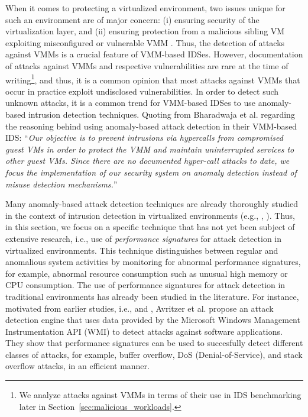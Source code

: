 When it comes to protecting a virtualized environment, two issues unique for such an environment are of major concern: (i) ensuring security of the virtualization layer, and (ii) ensuring protection from a malicious sibling VM exploiting misconfigured or vulnerable VMM \cite{bharadwaja:axen}. Thus, the detection of attacks against VMMs is a crucial feature of VMM-based IDSes. However, documentation of attacks against VMMs and respective vulnerabilities are rare at the time of writing\footnote{We analyze attacks against VMMs in terms of their use in IDS benchmarking later in Section~\ref{sec:malicious_workloads}.}, and thus, it is a common opinion that most attacks against VMMs that occur in practice exploit undisclosed vulnerabilities. In order to detect such unknown attacks, it is a common trend for VMM-based IDSes to use anomaly-based intrusion detection techniques. Quoting from Bharadwaja et al. \cite{bharadwaja:axen} regarding the reasoning behind using anomaly-based attack detection in their VMM-based IDS: ``\textit{Our objective is to prevent intrusions via hypercalls from compromised guest VMs in order to protect the VMM and maintain uninterrupted services to other guest VMs. Since there are no documented hyper-call attacks to date, we focus the implementation of our security system on anomaly detection instead of misuse detection mechanisms.}''

Many anomaly-based attack detection techniques are already thoroughly studied in the context of intrusion detection in virtualized environments (e.g., \cite{bharadwaja:axen}, \cite{avritzer:monitoring}). Thus, in this section, we focus on a specific technique that has not yet been subject of extensive research, i.e., use of \emph{performance signatures} for attack detection in virtualized environments. This technique distinguishes between regular and anomalious system activities by monitoring for abnormal performance signatures, for example, abnormal resource consumption such as unusual high memory or CPU consumption. The use of performance signatures for attack detection in traditional environments has already been studied in the literature. For instance, motivated from earlier studies, i.e., \cite{avritzer:the_automatic} and \cite{avritzer:ensuring}, Avritzer et al. \cite{avritzer:monitoring} propose an attack detection engine that uses data provided by the Microsoft Windows Management Instrumentation API (WMI) to detect attacks against software applications. They show that performance signatures can be used to succesfully detect different classes of attacks, for example, buffer overflow, DoS (Denial-of-Service), and stack overflow attacks, in an efficient manner. 

